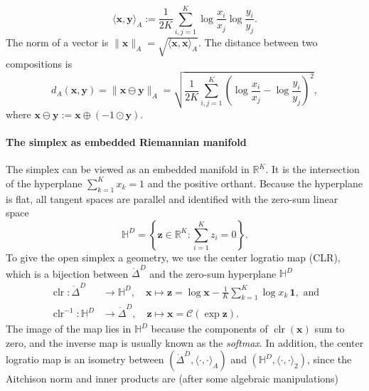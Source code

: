 \begin{equation*}
\langle \boldsymbol{x}, \boldsymbol{y} \rangle_A := \frac{1}{2K} \sum_{i,j=1}^{K} 
\log\frac{x_i}{x_j}\log\frac{y_i}{y_j}.
\end{equation*}
The norm of a vector is $\|\boldsymbol{x}\|_A = \sqrt{\langle \boldsymbol{x}, \boldsymbol{x} \rangle_A}$. The distance between two compositions is 
\begin{equation*}
    d_A(\boldsymbol x,\boldsymbol y) = 
    \|\boldsymbol{x} \ominus \boldsymbol{y}\|_A
= \sqrt{\frac{1}{2K}\sum_{i,j=1}^K
\left(\log\frac{x_i}{x_j}-\log\frac{y_i}{y_j}\right)^2 },
\end{equation*}
where $\boldsymbol{x} \ominus \boldsymbol{y} :=  \boldsymbol{x} \oplus  (-1 \odot\boldsymbol{y})$.

\paragraph{The simplex as embedded  Riemannian manifold}
The simplex can be viewed as an embedded manifold in $\mathbb{R}^K$. It is the intersection of the hyperplane $\sum_{k=1}^K x_k=1$ and the positive orthant. Because the hyperplane is flat, all tangent spaces are parallel and identified with the zero-sum linear space
\begin{equation*}
\mathbb{H}^{D}=\left\{\boldsymbol{z}\in\mathbb{R}^K:\sum_{i=1}^K z_i=0\right\}.
\end{equation*}
To give the open simplex a geometry, we use the center logratio map (CLR), which is a bijection between  $\mathring \Delta^D$ and the zero-sum hyperplane $\mathbb{H}^D$
\begin{equation*}
\begin{aligned}
    \operatorname{clr}: \mathring\Delta^D &\to \mathbb{H}^D, \quad
    \boldsymbol{x} \mapsto \boldsymbol{z}
    = \log \boldsymbol{x} - \frac{1}{K}\sum_{k=1}^{K} \log x_k \,\boldsymbol{1}, \text{ and} \\
    \operatorname{clr}^{-1}: \mathbb{H}^D &\to \mathring\Delta^D, \quad
    \boldsymbol{z} \mapsto \boldsymbol{x}
    = \mathcal{C} (\exp\boldsymbol{z}).
\end{aligned}
\end{equation*}
The image of the map lies in $\mathbb{H}^{D}$ because the components of $\operatorname{clr}(\boldsymbol{x})$ sum to zero, and the inverse map is usually known as the \emph{softmax}. In addition, the center logratio map is an isometry between $(\mathring\Delta^{D},\langle\cdot,\cdot\rangle_A)$ and $(\mathbb{H}^{D},\langle\cdot,\cdot\rangle_2)$, since the Aitchison norm and inner products are (after some algebraic manipulations)
